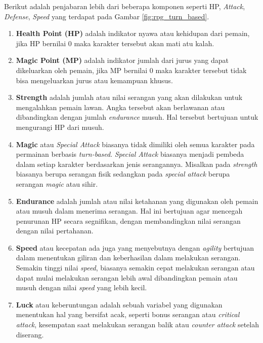 \begin{subs}
\begin{enumerate}[label=\textbf{\arabic*).}]
		Berikut adalah penjabaran lebih dari beberapa komponen seperti HP, \textit{Attack}, \textit{Defense}, \textit{Speed} yang terdapat pada Gambar \ref{fig:rpg_turn_based}.
		
		\begin{enumerate}[label=\alph*).]
			\item \textbf{Health Point (HP)} adalah indikator nyawa atau kehidupan dari pemain, jika HP bernilai 0 maka karakter tersebut akan mati atu kalah.
			
			\item \textbf{Magic Point (MP)} adalah indikator jumlah dari jurus yang dapat dikeluarkan oleh pemain, jika MP bernilai 0 maka karakter tersebut tidak bisa mengeluarkan jurus atau kemampuan khusus.
			
			\item \textbf{Strength} adalah jumlah atau nilai serangan yang akan dilakukan untuk mengalahkan pemain lawan. Angka tersebut akan berlawanan atau dibandingkan dengan jumlah \textit{endurance} musuh. Hal tersebut bertujuan untuk mengurangi HP dari musuh.
			
			\item \textbf{Magic} atau \textit{Special Attack} biasanya tidak dimiliki oleh semua karakter pada permainan berbasis \textit{turn-based}. \textit{Special Attack} biasanya menjadi pembeda dalam setiap karakter berdasarkan jenis serangannya. Misalkan pada \textit{strength} biasanya berupa serangan fisik sedangkan pada \textit{special attack} berupa serangan \textit{magic} atau sihir.
			
			\item \textbf{Endurance} adalah jumlah atau nilai ketahanan yang digunakan oleh pemain atau musuh dalam menerima serangan. Hal ini bertujuan agar mencegah penurunan HP secara segnifikan, dengan membandingkan nilai serangan dengan nilai pertahanan.
			
			\item \textbf{Speed} atau kecepatan ada juga yang menyebutnya dengan \textit{agility} bertujuan dalam menentukan giliran dan keberhasilan dalam melakukan serangan. Semakin tinggi nilai \textit{speed}, biasanya semakin cepat melakukan serangan atau dapat mulai melakukan serangan lebih awal dibandingkan pemain atau musuh dengan nilai \textit{speed} yang lebih kecil.
			
			\item \textbf{Luck} atau keberuntungan adalah sebuah variabel yang digunakan menentukan hal yang bersifat acak, seperti bonus serangan atau \textit{critical attack}, kesempatan saat melakukan serangan balik atau \textit{counter attack} setelah diserang.
		\end{enumerate}
		

\end{enumerate}
\end{subs}
